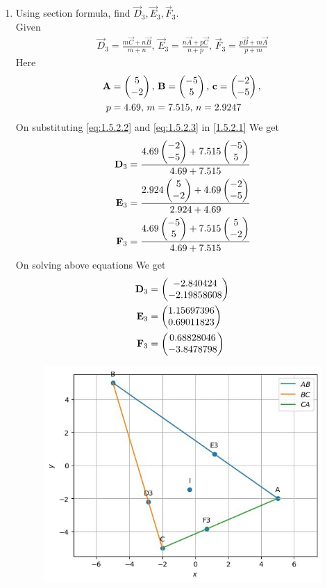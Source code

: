 \documentclass[11pt]{book}
\begin{document}
\begin{enumerate}[label=\thesection.\arabic*.,ref=\thesection.\theenumi]
\item Using section formula, find $\vec{D}_3, \vec{E}_3, \vec{F}_3$. \\
\solution Given
\begin{align}
			\vec{D}_3 = \frac{m\vec{C}+n\vec{B}}{m+n},\,
			\vec{E}_3 = \frac{n\vec{A}+p\vec{C}}{n+p},\,
			\vec{F}_3 = \frac{p\vec{B}+m\vec{A}}{p+m} \label{eq:1.5.2.1}
\end{align}
Here
\begin{align}
	\vec{A} &= \myvec{5 \\ -2},\,
	\vec{B} = \myvec{-5\\5},\,
	\vec{c} = \myvec{-2\\-5},\, \label{eq:1.5.2.2} \\
	p &= 4.69,\,
	m = 7.515,\,
	n = 2.9247  \label{eq:1.5.2.3}
\end{align}
On substituting \eqref{eq:1.5.2.2} and \eqref{eq:1.5.2.3} in \eqref{1.5.2.1} We get
\begin{align}
    \mathbf{D}_3 &= \frac{4.69\begin{pmatrix}-2 \\ -5\end{pmatrix} + 7.515\begin{pmatrix}-5\\5\end{pmatrix}}{4.69+7.515 } \\
    \mathbf{E}_3 &= \frac{2.924\begin{pmatrix}5 \\ -2\end{pmatrix} + 4.69\begin{pmatrix}-2\\-5\end{pmatrix}}{2.924+4.69} \\
    \mathbf{F}_3 &= \frac{4.69\begin{pmatrix}-5 \\ 5\end{pmatrix} + 7.515\begin{pmatrix}5\\-2\end{pmatrix}}{4.69+7.515}
\end{align}
On solving above equations We get 
\begin{align}
    \mathbf{D}_3 &= \begin{pmatrix}-2.840424  \\ -2.19858608
    \end{pmatrix} \\
    \mathbf{E}_3 &= \begin{pmatrix}1.15697396  \\ 0.69011823\end{pmatrix} \\
    \mathbf{F}_3 &= \begin{pmatrix}0.68828046  \\ -3.8478798\end{pmatrix} 
\end{align}
\begin{figure}[H]
\includegraphics[width=\columnwidth]{figs/1000.jpg}

\end{figure}
\end{enumerate}
\end{document}
